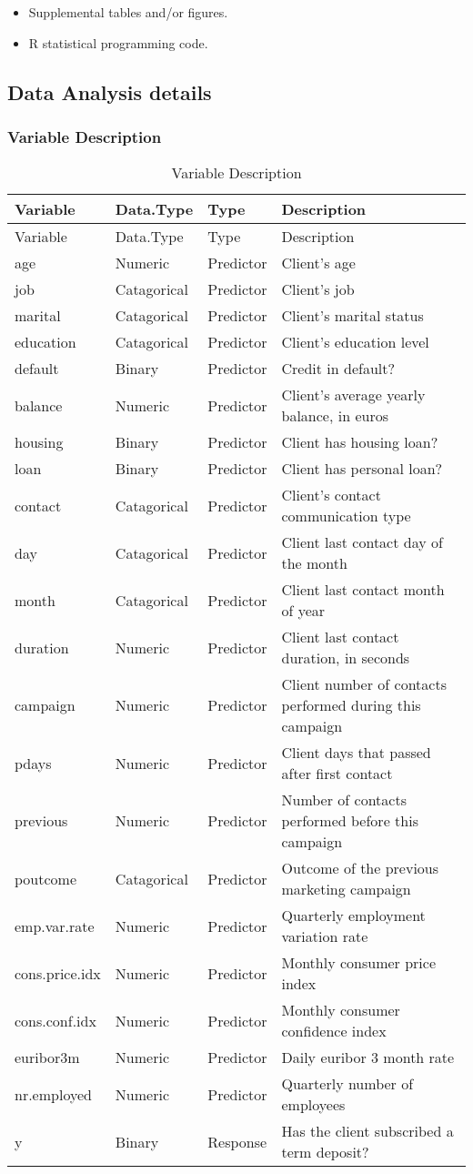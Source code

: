 \documentclass[english,floatsintext,man]{apa6}
\begin{document}
\begin{itemize}
\itemsep1pt\parskip0pt
\item
  Supplemental tables and/or figures.
\item
  R statistical programming code.
\end{itemize}

\subsection{Data Analysis details}\label{data-analysis-details}

\subsubsection{Variable Description}\label{variable-description}

\begin{longtable}[c]{@{}llll@{}}
\caption{Variable Description}\tabularnewline
\toprule
Variable & Data.Type & Type & Description\tabularnewline
\midrule
\endfirsthead
\toprule
Variable & Data.Type & Type & Description\tabularnewline
\midrule
\endhead
age & Numeric & Predictor & Client's age\tabularnewline
job & Catagorical & Predictor & Client's job\tabularnewline
marital & Catagorical & Predictor & Client's marital
status\tabularnewline
education & Catagorical & Predictor & Client's education
level\tabularnewline
default & Binary & Predictor & Credit in default?\tabularnewline
balance & Numeric & Predictor & Client's average yearly balance, in
euros\tabularnewline
housing & Binary & Predictor & Client has housing loan?\tabularnewline
loan & Binary & Predictor & Client has personal loan?\tabularnewline
contact & Catagorical & Predictor & Client's contact communication
type\tabularnewline
day & Catagorical & Predictor & Client last contact day of the
month\tabularnewline
month & Catagorical & Predictor & Client last contact month of
year\tabularnewline
duration & Numeric & Predictor & Client last contact duration, in
seconds\tabularnewline
campaign & Numeric & Predictor & Client number of contacts performed
during this campaign\tabularnewline
pdays & Numeric & Predictor & Client days that passed after first
contact\tabularnewline
previous & Numeric & Predictor & Number of contacts performed before
this campaign\tabularnewline
poutcome & Catagorical & Predictor & Outcome of the previous marketing
campaign\tabularnewline
emp.var.rate & Numeric & Predictor & Quarterly employment variation
rate\tabularnewline
cons.price.idx & Numeric & Predictor & Monthly consumer price
index\tabularnewline
cons.conf.idx & Numeric & Predictor & Monthly consumer confidence
index\tabularnewline
euribor3m & Numeric & Predictor & Daily euribor 3 month
rate\tabularnewline
nr.employed & Numeric & Predictor & Quarterly number of
employees\tabularnewline
y & Binary & Response & Has the client subscribed a term
deposit?\tabularnewline
\bottomrule
\end{longtable}
\end{document}
